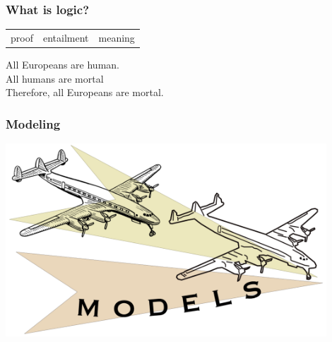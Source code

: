\documentclass[fleqn,10pt,serif,xcolor=svgnames,xcolor=table,aspectratio=169]{beamer}
\begin{document}
\begin{frame}
  \frametitle{What is logic?}

  \begin{center}
    \begin{Large}
      \begin{tabular}{C{2cm}C{4cm}C{2cm}}
        proof & entailment & meaning
      \end{tabular}
    \end{Large}
  \end{center}

  \pause
  \bigskip

  \begin{center}
    All Europeans are human.\\
    All humans are mortal\\
    Therefore, all Europeans are mortal.
  \end{center}
\end{frame}

\begin{frame}
  \frametitle{Modeling}

  \includegraphics[width=0.9\textwidth]{00-introduction-pics/model-planes.png}

\end{frame}
\end{document}
